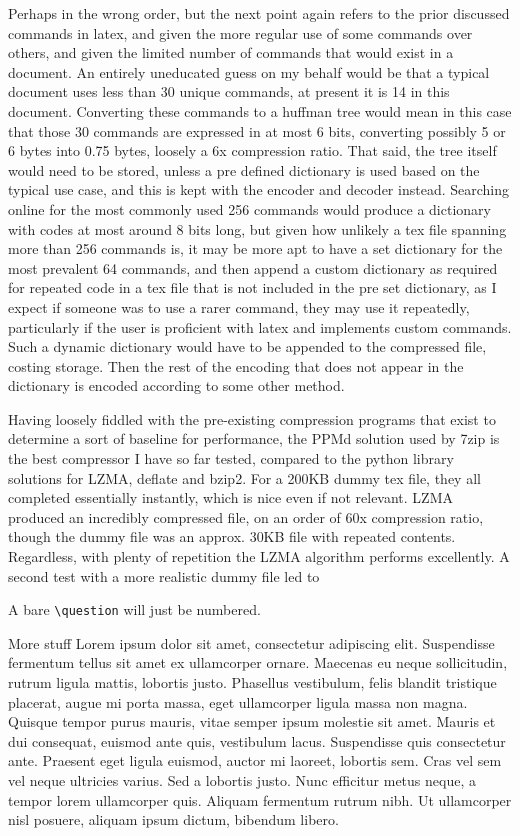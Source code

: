 \documentclass{homework}
\begin{document}
Perhaps in the wrong order, but the next point again refers to the prior discussed commands in latex, and given the more regular use of some commands over others, and given the limited number of commands that would exist in a document. An entirely uneducated guess on my behalf would be that a typical document uses less than 30 unique commands, at present it is 14 in this document. Converting these commands to a huffman tree would mean in this case that those 30 commands are expressed in at most 6 bits, converting possibly 5 or 6 bytes into 0.75 bytes, loosely a 6x compression ratio. That said, the tree itself would need to be stored, unless a pre defined dictionary is used based on the typical use case, and this is kept with the encoder and decoder instead. Searching online for the most commonly used 256 commands would produce a dictionary with codes at most around 8 bits long, but given how unlikely a tex file spanning more than 256 commands is, it may be more apt to have a set dictionary for the most prevalent 64 commands, and then append a custom dictionary as required for repeated code in a tex file that is not included in the pre set dictionary, as I expect if someone was to use a rarer command, they may use it repeatedly, particularly if the user is proficient with latex and implements custom commands. Such a dynamic dictionary would have to be appended to the compressed file, costing storage. Then the rest of the encoding that does not appear in the dictionary is encoded according to some other method.

Having loosely fiddled with the pre-existing compression programs that exist to determine a sort of baseline for performance, the PPMd solution used by 7zip is the best compressor I have so far tested, compared to the python library solutions for LZMA, deflate and bzip2. For a 200KB dummy tex file, they all completed essentially instantly, which is nice even if not relevant. LZMA produced an incredibly compressed file, on an order of 60x compression ratio, though the dummy file was an approx. 30KB file with repeated contents. Regardless, with plenty of repetition the LZMA algorithm performs excellently. A second test with a more realistic dummy file led to 

\question
A bare \verb|\question| will just be numbered. 

\question
More stuff
Lorem ipsum dolor sit amet, consectetur adipiscing elit. Suspendisse fermentum tellus sit amet ex ullamcorper ornare. Maecenas eu neque sollicitudin, rutrum ligula mattis, lobortis justo. Phasellus vestibulum, felis blandit tristique placerat, augue mi porta massa, eget ullamcorper ligula massa non magna. Quisque tempor purus mauris, vitae semper ipsum molestie sit amet. Mauris et dui consequat, euismod ante quis, vestibulum lacus. Suspendisse quis consectetur ante. Praesent eget ligula euismod, auctor mi laoreet, lobortis sem. Cras vel sem vel neque ultricies varius. Sed a lobortis justo. Nunc efficitur metus neque, a tempor lorem ullamcorper quis. Aliquam fermentum rutrum nibh. Ut ullamcorper nisl posuere, aliquam ipsum dictum, bibendum libero.
\end{document}
